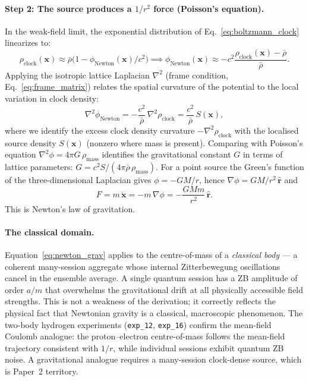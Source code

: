 \paragraph{Step 2: The source produces a $1/r^2$ force (Poisson's equation).}
In the weak-field limit, the exponential distribution of Eq.~\eqref{eq:boltzmann_clock}
linearizes to:
\begin{equation}
    \rho_\mathrm{clock}(\mathbf{x}) \approx \bar\rho \bigl(1 - \phi_\mathrm{Newton}(\mathbf{x})/c^2\bigr)
    \implies \phi_\mathrm{Newton}(\mathbf{x}) \approx -c^2 \frac{\rho_\mathrm{clock}(\mathbf{x}) - \bar\rho}{\bar\rho}.
\end{equation}
Applying the isotropic lattice Laplacian $\nabla^2$
(frame condition, Eq.~\eqref{eq:frame_matrix}) relates the spatial curvature of the potential
to the local variation in clock density:
\begin{equation}
    \nabla^2\phi_\mathrm{Newton} = -\frac{c^2}{\bar\rho}\,\nabla^2\rho_\mathrm{clock}
                = \frac{c^2}{\bar\rho}\,S(\mathbf{x}),
    \label{eq:poisson_derive}
\end{equation}
where we identify the excess clock density curvature $-\nabla^2\rho_\mathrm{clock}$ with the localised
source density $S(\mathbf{x})$ (nonzero where mass
is present).  Comparing with Poisson's equation
$\nabla^2\phi = 4\pi G\,\rho_\mathrm{mass}$ identifies the
gravitational constant $G$ in terms of lattice parameters:
$G = c^2 S/(4\pi\bar\rho\,\rho_\mathrm{mass})$.
For a point source the Green's function of the three-dimensional
Laplacian gives $\phi = -GM/r$, hence
$\nabla\phi = GM/r^2\,\hat{\mathbf{r}}$ and
\begin{equation}
    F = m\,\ddot{\mathbf{x}}
      = -m\,\nabla\phi
      = -\frac{GMm}{r^2}\,\hat{\mathbf{r}}.
    \label{eq:newton_grav}
\end{equation}
This is Newton's law of gravitation.

\paragraph{The classical domain.}
Equation~\eqref{eq:newton_grav} applies to the centre-of-mass of a
\emph{classical body} --- a coherent many-session aggregate whose
internal Zitterbewegung oscillations cancel in the ensemble average.
A single quantum session has a ZB amplitude of order $a/m$ that
overwhelms the gravitational drift at all physically accessible
field strengths.
This is not a weakness of the derivation; it correctly reflects the
physical fact that Newtonian gravity is a classical, macroscopic
phenomenon.
The two-body hydrogen experiments (\texttt{exp\_12}, \texttt{exp\_16})
confirm the mean-field Coulomb analogue: the proton--electron
centre-of-mass follows the mean-field trajectory consistent with $1/r$,
while individual sessions exhibit quantum ZB noise.
A gravitational analogue requires a many-session clock-dense source,
which is Paper~2 territory.

